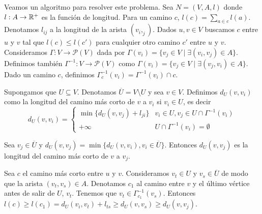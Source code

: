 \documentclass[AL.tex]{subfiles}
\begin{document}
Veamos un algoritmo para resolver este problema. Sea $N=(V,A,l)$ donde $l:A\to\mathbb{R}^+$ es la función de longitud. Para un camino $c$, $l(c)=\sum_{a\in c}l(a)$. Denotamos $l_{ij}$ a la longitud de la arista $(v_i,_j)$. Dados $u,v\in V$ buscamos $c$ entre $u$ y $v$ tal que $l(c)\leq l(c')$ para cualquier otro camino $c'$ entre $u$ y $v$. Consideramos $\Gamma:V\to \mathcal{P}(V)$ dada por $\Gamma(v_i)=\{v_j\in V\mid \exists(v_i,v_j)\in A\}$. Definimos también $\Gamma^{-1}:V\to\mathcal{P}(V)$ como $\Gamma(v_i)=\{v_j\in V\mid \exists(v_j,v_i)\in A\}$. Dado un camino $c$, definimos $\Gamma^{-1}_c(v_i)=\Gamma^{-1}(v_i)\cap c$. 

Supongamos que $U\subseteq V$. Denotamos $\overline{U}=V\setminus U$ y sea $v\in V$. Definimos $d_U(v,v_i)$ como la longitud del camino más corto de $v$ a $v_i$ si $v_i\in U$, es decir
\[
d_U(v,v_i)=\begin{cases}
\min\{d_U(v,v_j)+l_{ji}\} & v_i\in U, v_j\in U\cap \Gamma^{-1}(v_i)\\
+\infty &  U\cap \Gamma^{-1}(v_i)=\emptyset
\end{cases}
\]

\begin{teorema}
Sea $v_j\in\overline{U}$ y $d_U(v,v_j)=\min\{d_U(v,v_i), v_i\in\overline{U}\}$. Entonces $d_U(v,v_j)$ es la longitud del camino más corto de $v$ a $v_j$. 
\end{teorema}
\begin{dem}
Sea $c$ el camino más corto entre $u$ y $v$. Consideramos $v_t\in U$ y $v_s\in\overline{U}$ de modo que la arista $(v_t,v_s)\in A$. Denotamos $c_1$ al camino entre $v$ y el último vértice antes de salir de $U$, $v_t$. Tenemos que $v_t\in \Gamma^{-1}_{c_1}(v_s)$. Entonces $l(c)\geq l(c_1)=d_U(v_i, v_t)+l_{ts}\geq d_U(v,v_s)\geq d_U(v,v_j)$.
\end{dem}
\end{document}
